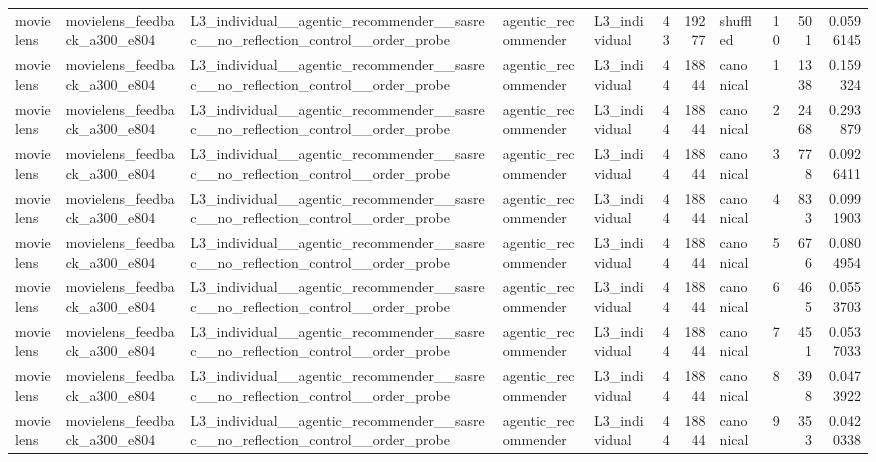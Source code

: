 \begin{table}[htbp!]
\begin{tabular}{lllllrrlrrr}
movielens & movielens\_feedback\_a300\_e804 & L3\_individual\_\_agentic\_recommender\_\_sasrec\_\_no\_reflection\_control\_\_order\_probe & agentic\_recommender & L3\_individual & 43 & 19277 & shuffled & 10 & 501 & 0.0596145 \\
movielens & movielens\_feedback\_a300\_e804 & L3\_individual\_\_agentic\_recommender\_\_sasrec\_\_no\_reflection\_control\_\_order\_probe & agentic\_recommender & L3\_individual & 44 & 18844 & canonical & 1 & 1338 & 0.159324 \\
movielens & movielens\_feedback\_a300\_e804 & L3\_individual\_\_agentic\_recommender\_\_sasrec\_\_no\_reflection\_control\_\_order\_probe & agentic\_recommender & L3\_individual & 44 & 18844 & canonical & 2 & 2468 & 0.293879 \\
movielens & movielens\_feedback\_a300\_e804 & L3\_individual\_\_agentic\_recommender\_\_sasrec\_\_no\_reflection\_control\_\_order\_probe & agentic\_recommender & L3\_individual & 44 & 18844 & canonical & 3 & 778 & 0.0926411 \\
movielens & movielens\_feedback\_a300\_e804 & L3\_individual\_\_agentic\_recommender\_\_sasrec\_\_no\_reflection\_control\_\_order\_probe & agentic\_recommender & L3\_individual & 44 & 18844 & canonical & 4 & 833 & 0.0991903 \\
movielens & movielens\_feedback\_a300\_e804 & L3\_individual\_\_agentic\_recommender\_\_sasrec\_\_no\_reflection\_control\_\_order\_probe & agentic\_recommender & L3\_individual & 44 & 18844 & canonical & 5 & 676 & 0.0804954 \\
movielens & movielens\_feedback\_a300\_e804 & L3\_individual\_\_agentic\_recommender\_\_sasrec\_\_no\_reflection\_control\_\_order\_probe & agentic\_recommender & L3\_individual & 44 & 18844 & canonical & 6 & 465 & 0.0553703 \\
movielens & movielens\_feedback\_a300\_e804 & L3\_individual\_\_agentic\_recommender\_\_sasrec\_\_no\_reflection\_control\_\_order\_probe & agentic\_recommender & L3\_individual & 44 & 18844 & canonical & 7 & 451 & 0.0537033 \\
movielens & movielens\_feedback\_a300\_e804 & L3\_individual\_\_agentic\_recommender\_\_sasrec\_\_no\_reflection\_control\_\_order\_probe & agentic\_recommender & L3\_individual & 44 & 18844 & canonical & 8 & 398 & 0.0473922 \\
movielens & movielens\_feedback\_a300\_e804 & L3\_individual\_\_agentic\_recommender\_\_sasrec\_\_no\_reflection\_control\_\_order\_probe & agentic\_recommender & L3\_individual & 44 & 18844 & canonical & 9 & 353 & 0.0420338 \\

\end{tabular}
\end{table}
